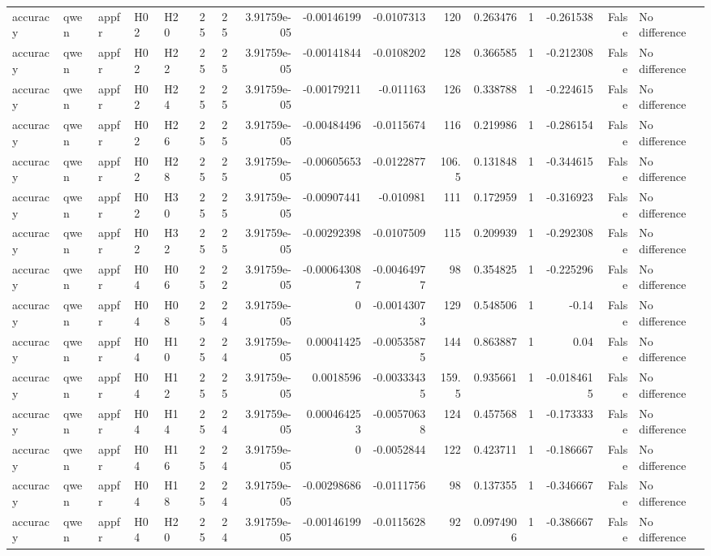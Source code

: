\begin{longtable}{lllllrrrrrrrrrrl}
accuracy & qwen & appfr & H02 & H20 & 25 & 25 & 3.91759e-05 & -0.00146199 & -0.0107313 & 120 & 0.263476 & 1 & -0.261538 & False & No difference \\
accuracy & qwen & appfr & H02 & H22 & 25 & 25 & 3.91759e-05 & -0.00141844 & -0.0108202 & 128 & 0.366585 & 1 & -0.212308 & False & No difference \\
accuracy & qwen & appfr & H02 & H24 & 25 & 25 & 3.91759e-05 & -0.00179211 & -0.011163 & 126 & 0.338788 & 1 & -0.224615 & False & No difference \\
accuracy & qwen & appfr & H02 & H26 & 25 & 25 & 3.91759e-05 & -0.00484496 & -0.0115674 & 116 & 0.219986 & 1 & -0.286154 & False & No difference \\
accuracy & qwen & appfr & H02 & H28 & 25 & 25 & 3.91759e-05 & -0.00605653 & -0.0122877 & 106.5 & 0.131848 & 1 & -0.344615 & False & No difference \\
accuracy & qwen & appfr & H02 & H30 & 25 & 25 & 3.91759e-05 & -0.00907441 & -0.010981 & 111 & 0.172959 & 1 & -0.316923 & False & No difference \\
accuracy & qwen & appfr & H02 & H32 & 25 & 25 & 3.91759e-05 & -0.00292398 & -0.0107509 & 115 & 0.209939 & 1 & -0.292308 & False & No difference \\
accuracy & qwen & appfr & H04 & H06 & 25 & 22 & 3.91759e-05 & -0.000643087 & -0.00464977 & 98 & 0.354825 & 1 & -0.225296 & False & No difference \\
accuracy & qwen & appfr & H04 & H08 & 25 & 24 & 3.91759e-05 & 0 & -0.00143073 & 129 & 0.548506 & 1 & -0.14 & False & No difference \\
accuracy & qwen & appfr & H04 & H10 & 25 & 24 & 3.91759e-05 & 0.00041425 & -0.00535875 & 144 & 0.863887 & 1 & 0.04 & False & No difference \\
accuracy & qwen & appfr & H04 & H12 & 25 & 25 & 3.91759e-05 & 0.0018596 & -0.00333435 & 159.5 & 0.935661 & 1 & -0.0184615 & False & No difference \\
accuracy & qwen & appfr & H04 & H14 & 25 & 24 & 3.91759e-05 & 0.000464253 & -0.00570638 & 124 & 0.457568 & 1 & -0.173333 & False & No difference \\
accuracy & qwen & appfr & H04 & H16 & 25 & 24 & 3.91759e-05 & 0 & -0.0052844 & 122 & 0.423711 & 1 & -0.186667 & False & No difference \\
accuracy & qwen & appfr & H04 & H18 & 25 & 24 & 3.91759e-05 & -0.00298686 & -0.0111756 & 98 & 0.137355 & 1 & -0.346667 & False & No difference \\
accuracy & qwen & appfr & H04 & H20 & 25 & 24 & 3.91759e-05 & -0.00146199 & -0.0115628 & 92 & 0.0974906 & 1 & -0.386667 & False & No difference \\

\end{longtable}
